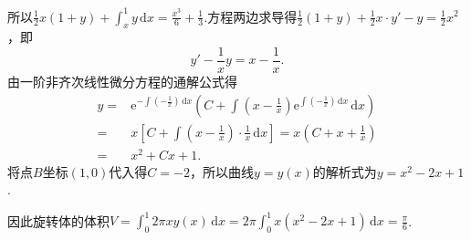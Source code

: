 \documentclass[../main.tex]{subfiles}
\begin{document}
\begin{enumerate}
          所以$\frac{1}{2}x(1+y)+\int_{x}^{1}y\,\mathrm{d}x=\frac{x^{3}}{6}+\frac{1}{3}$.方程两边求导得$\frac{1}{2}
              (1+y)+\frac{1}{2}x\cdot y'-y=\frac{1}{2}x^{2}$，即
          \[
              y'-\frac{1}{x}y=x-\frac{1}{x}.
          \]
          由一阶非齐次线性微分方程的通解公式得
          \[
              \begin{aligned}
                  y = {} & \mathrm{e}^{-\int\left(-\frac{1}{x}\right)\,\mathrm{d}x}\left(C+\int\left(x-\frac{1}{x}\right)\mathrm{e}^{\int\left(-\frac{1}{x}\right)\,\mathrm{d}x}\,\mathrm{d}x\right) \\
                  = {}   & x\left[C+\int\left(x-\frac{1}{x}\right)\cdot\frac{1}{x}\,\mathrm{d}x\right] = x\left(C+x+\frac{1}{x}\right)                                                               \\
                  = {}   & x^{2}+Cx+1.
              \end{aligned}
          \]
          将点$B$坐标$(1,0)$代入得$C=-2$，所以曲线$y=y(x)$的解析式为$y=x^{2}-2x+1$.

          因此旋转体的体积$V=\int_{0}^{1}2\pi xy(x)\,\mathrm{d}x=2\pi\int_{0}^{1}x\left
              (x^{2}-2x+1\right)\,\mathrm{d}x=\frac{\pi}{6}$.
\end{enumerate}
\end{document}
